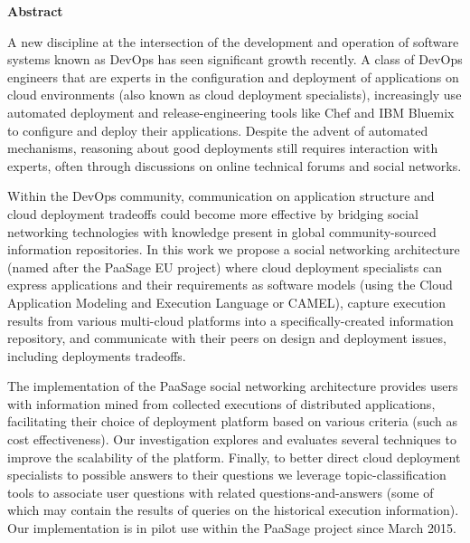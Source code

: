 \thispagestyle{empty}
\begin{titlepage}
\begin{center}
{\bf\Large Abstract}\\
\end{center}

\indent A new discipline at the intersection of the development and operation of software systems known as DevOps has seen significant growth recently. A class of DevOps engineers that are experts in the configuration and deployment of applications on cloud environments (also known as cloud deployment specialists), increasingly use automated deployment and release-engineering tools like Chef and IBM Bluemix to configure and deploy their applications.  Despite the advent of automated mechanisms, reasoning about good deployments still requires interaction with experts, often through discussions on online technical forums and social networks. 

Within the DevOps community, communication on application structure and cloud deployment tradeoffs could become more effective by bridging social networking technologies with knowledge present in global community-sourced information repositories.  In this work we propose a social networking architecture (named after the PaaSage EU project) where cloud deployment specialists can express applications and their requirements as software models (using the Cloud Application Modeling and Execution Language or CAMEL), capture execution results from various multi-cloud platforms into a specifically-created information repository, and communicate with their peers on design and deployment issues, including deployments tradeoffs.

The implementation of the PaaSage social networking architecture provides users with information mined from collected executions of distributed applications, facilitating their choice of deployment platform based on various criteria (such as cost effectiveness). Our investigation explores and evaluates several techniques to improve the scalability of the platform.  Finally, to better direct cloud deployment specialists to possible answers to their questions we leverage topic-classification tools to associate user questions with related questions-and-answers (some of which may contain the results of queries on the historical execution information). Our implementation is in pilot use within the PaaSage project since March 2015.

\vfill
\end{titlepage}

